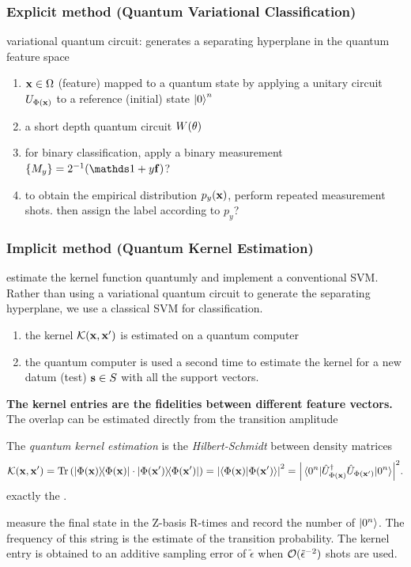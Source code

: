 \subsubsection{Explicit method (Quantum Variational Classification)}
variational quantum circuit: generates a separating hyperplane in the quantum feature space
\begin{enumerate}
	\item $\vb{x}\in\Omega$ (feature) mapped to a quantum state by applying a unitary circuit $U_{\Phi(\vb{x})}$ to a reference (initial) state $\ket{0}^n$
	\item a short depth quantum circuit $W(\vb{\theta})$
	\item for binary classification, apply a binary measurement $\qty{M_y}=2^{-1}(\identity + y \vb{f})$?
	\item to obtain the empirical distribution $p_y(\vb{x})$, perform repeated measurement shots.
	then assign the label according to $p_y$?
\end{enumerate}

\subsubsection{Implicit method (Quantum Kernel Estimation)}
estimate the kernel function quantumly and implement a conventional SVM.
Rather than using a variational quantum circuit to generate the separating hyperplane, we use a classical SVM for classification.
\begin{enumerate}
	\item the kernel $\mathcal{K}(\vb{x},\vb{x}')$ is estimated on a quantum computer
	\item the quantum computer is used a second time to estimate the kernel for a new datum (test) $\vb{s}\in S$ with all the support vectors.
\end{enumerate}

\textbf{The kernel entries are the fidelities between different feature vectors.}
The overlap can be estimated directly from the transition amplitude 
\begin{definition}\label{def:quantum_kernel}
	The \emph{quantum kernel estimation} is the \emph{Hilbert-Schmidt}  between density matrices
	\begin{equation}
		\kernel(\vbx,\vbx') 
		= \Tr\qty(\dyad{\Phi(\vbx)}\cdot \dyad{\Phi(\vbx')})
		= \abs{\braket{\Phi(\vbx)}{\Phi(\vbx')}}^2 = 
		\abs{\matrixel{0^n}{\U^\dagger_{\Phi(\vbx)} \U_{\Phi(\vbx')}}{0^n}}^2.
	\end{equation}
	exactly the .
\end{definition}
measure the final state in the Z-basis R-times and record the number of $\ket{0^n}$.
The frequency of this string is the estimate of the transition probability.
The kernel entry is obtained to an additive sampling error of $\tilde{\epsilon}$ when $\mathcal{O}(\tilde{\epsilon}^{-2})$ shots are used.

